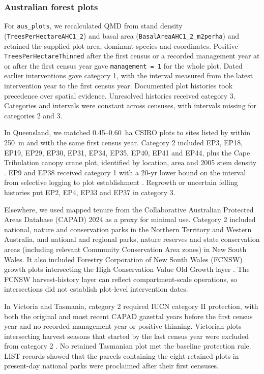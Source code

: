 \documentclass{myreport}
\begin{document}
\subsubsection{Australian forest plots}
For \texttt{aus\_plots}, we recalculated QMD from stand density (\texttt{TreesPerHectareAHC1\_2}) and basal area (\texttt{BasalAreaAHC1\_2\_m2perha}) and retained the supplied plot area, dominant species and coordinates. Positive \texttt{TreesPerHectareThinned} after the first census or a recorded management year at or after the first census year gave \texttt{management = 1} for the whole plot. Dated earlier interventions gave category 1, with the interval measured from the latest intervention year to the first census year. Documented plot histories took precedence over spatial evidence. Unresolved histories received category 3. Categories and intervals were constant across censuses, with intervals missing for categories 2 and 3.

In Queensland, we matched 0.45--0.60~ha CSIRO plots to sites listed by \citet{graham06rainforest} within 250~m and with the same first census year. Category 2 included EP3, EP18, EP19, EP29, EP30, EP31, EP34, EP35, EP40, EP41 and EP44, plus the Cape Tribulation canopy crane plot, identified by location, area and 2005 stem density \citep{laidlaw07australecol}. EP9 and EP38 received category 1 with a 20-yr lower bound on the interval from selective logging to plot establishment \citep{bauman22nature}. Regrowth or uncertain felling histories put EP2, EP4, EP33 and EP37 in category 3.

Elsewhere, we used mapped tenure from the Collaborative Australian Protected Areas Database (CAPAD) 2024 \citep{commonwealth25capad} as a proxy for minimal use. Category 2 included national, nature and conservation parks in the Northern Territory and Western Australia, and national and regional parks, nature reserves and state conservation areas (including relevant Community Conservation Area zones) in New South Wales. It also included Forestry Corporation of New South Wales (FCNSW) growth plots \citep{nsw09rfa} intersecting the High Conservation Value Old Growth layer \citep{nswepaoldgrowth}. The FCNSW harvest-history layer \citep{fcnsw23harvest} can reflect compartment-scale operations, so intersections did not establish plot-level intervention dates.

In Victoria and Tasmania, category 2 required IUCN category II protection, with both the original and most recent CAPAD gazettal years before the first census year and no recorded management year or positive thinning. Victorian plots intersecting harvest seasons that started by the last census year were excluded from category 2 \citep{victorianlogginghistory}. No retained Tasmanian plot met the baseline protection rule. LIST records \citep{tasmania11publicland} showed that the parcels containing the eight retained plots in present-day national parks were proclaimed after their first censuses.
\end{document}
